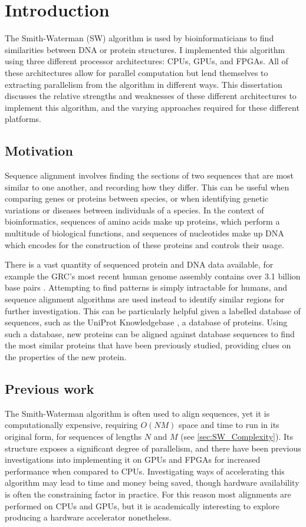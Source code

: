 
\chapter{Introduction}
The Smith-Waterman (SW) algorithm is used by bioinformaticians to find similarities between DNA or protein structures.
I implemented this algorithm using three different processor architectures: CPUs, GPUs, and FPGAs.
All of these architectures allow for parallel computation but lend themselves to extracting parallelism from the algorithm in different ways.
This dissertation discusses the relative strengths and weaknesses of these different architectures to implement this algorithm, and the varying approaches required for these different platforms.

\section{Motivation}
Sequence alignment involves finding the sections of two sequences that are most similar to one another, and recording how they differ.
This can be useful when comparing genes or proteins between species, or when identifying genetic variations or diseases between individuals of a species.
In the context of bioinformatics, sequences of amino acids make up proteins, which perform a multitude of biological functions, and sequences of nucleotides make up DNA which encodes for the construction of these proteins and controls their usage.

There is a vast quantity of sequenced protein and DNA data available, for example the GRC’s most recent human genome assembly contains over 3.1 billion base pairs \cite{GRCh38}.
Attempting to find patterns is simply intractable for humans, and sequence alignment algorithms are used instead to identify similar regions for further investigation.
This can be particularly helpful given a labelled database of sequences, such as the UniProt Knowledgebase \cite{UniProt}, a database of proteins.
Using such a database, new proteins can be aligned against database sequences to find the most similar proteins that have been previously studied, providing clues on the properties of the new protein.

\section{Previous work}
The Smith-Waterman algorithm \cite{SW_Original} is often used to align sequences, yet it is computationally expensive, requiring $O(NM)$ space and time to run in its original form, for sequences of lengths $N$ and $M$ (see \cref{sec:SW_Complexity}).
Its structure exposes a significant degree of parallelism, and there have been previous investigations into implementing it on GPUs and FPGAs for increased performance when compared to CPUs.
Investigating ways of accelerating this algorithm may lead to time and money being saved, though hardware availability is often the constraining factor in practice.
For this reason most alignments are performed on CPUs and GPUs, but it is academically interesting to explore producing a hardware accelerator nonetheless.

